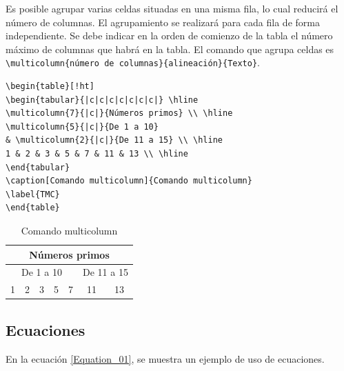 \documentclass[10pt,a4paper]{article}
\begin{document}
\bigskip

Es posible agrupar varias celdas situadas en una misma fila, lo cual reducirá el número de columnas. El agrupamiento se realizará para cada fila de forma independiente. Se debe indicar en la orden de comienzo de la tabla el número máximo de columnas que habrá en la tabla. El comando que agrupa celdas es \verb/\multicolumn{número de columnas}{alineación}{Texto}/. 

\bigskip

\begin{center}
\begin{table}[!ht]
\begin{minipage}{0.65\textwidth}
\begin{verbatim}
\begin{table}[!ht]
\begin{tabular}{|c|c|c|c|c|c|c|} \hline
\multicolumn{7}{|c|}{Números primos} \\ \hline
\multicolumn{5}{|c|}{De 1 a 10} 
& \multicolumn{2}{|c|}{De 11 a 15} \\ \hline
1 & 2 & 3 & 5 & 7 & 11 & 13 \\ \hline
\end{tabular}
\caption[Comando multicolumn]{Comando multicolumn}
\label{TMC}
\end{table}
\end{verbatim}
\end{minipage}
\begin{minipage}{0.35\textwidth}
\begin{center}
\begin{tabular}{|c|c|c|c|c|c|c|}
\hline
\multicolumn{7}{|c|}{Números primos} \\ \hline
\multicolumn{5}{|c|}{De 1 a 10} & \multicolumn{2}{|c|}{De 11 a 15}\\
\hline
1 & 2 & 3 & 5 & 7 & 11 & 13 \\ \hline
\end{tabular}
\end{center}
\caption[Comando multicolumn]{Comando multicolumn}\label{TMC}
\end{minipage}
\end{table}
\end{center}

\subsection{Ecuaciones}

En la ecuación \ref{Equation_01}, se muestra un ejemplo de uso de ecuaciones.
\end{document}
